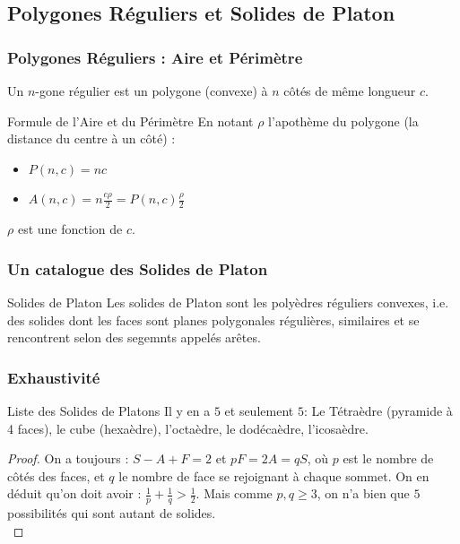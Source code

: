 \documentclass{../beamercours}
\begin{document}
\subsection{Polygones Réguliers et Solides de Platon}
\begin{frame}
\frametitle{Polygones Réguliers : Aire et Périmètre}
Un $n$-gone régulier est un polygone (convexe) à $n$ côtés de même longueur $c$.
\begin{théorème}{Formule de l'Aire et du Périmètre}{}
En notant $\rho$ l'apothème du polygone (la distance du centre à un côté) :
\begin{itemize}
    \item $P(n, c) = nc$
    \item $A(n, c) = n\frac{c\rho}{2} = P(n, c)\frac{\rho}{2}$
\end{itemize}
$\rho$ est une fonction de $c$.
\end{théorème}
\end{frame}

\begin{frame}
\frametitle{Un catalogue des Solides de Platon}
\begin{définition}{Solides de Platon}{}
Les solides de Platon sont les polyèdres réguliers convexes, i.e. des solides dont les faces sont planes polygonales régulières, similaires et se rencontrent selon des segemnts appelés arêtes.
\end{définition}
\end{frame}

\begin{frame}
\frametitle{Exhaustivité}
\begin{théorème}{Liste des Solides de Platons}{}
Il y en a $5$ et seulement $5$: Le Tétraèdre (pyramide à 4 faces), le cube (hexaèdre), l'octaèdre, le dodécaèdre, l'icosaèdre.
\end{théorème}
\begin{proof}\small
    On a toujours : $S - A + F = 2$ et $pF = 2A = qS$, où $p$ est le nombre de côtés des faces, et $q$ le nombre de face se rejoignant à chaque sommet. 
    On en déduit qu'on doit avoir : $\frac{1}{p} + \frac{1}{q} > \frac{1}{2}$. Mais comme $p, q \geq 3$, on n'a bien que $5$ possibilités qui sont autant de solides.\\
\end{proof}
\end{frame}
\end{document}
